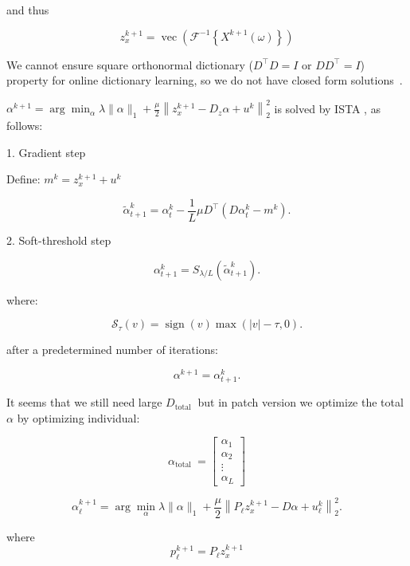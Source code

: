\documentclass{article}
\newcounter{subsubsubsection}[subsubsection]
\theoremstyle{definition}
\begin{document}
and thus

$$
z_x^{k+1}=\operatorname{vec}\left(\mathcal{F}^{-1}\left\{X^{k+1}(\omega)\right\}\right)
$$



















We cannot ensure square orthonormal dictionary ($D^{\top} D=I$ or $ DD^{\top}=I$) property for online dictionary learning, so we do not have closed form solutions~\cite{OnlineDLearn}.

$\alpha^{k+1}=\arg \min _\alpha \lambda\|\alpha\|_1+\frac{\mu}{2}\left\|z_x^{k+1}-D_z \alpha+u^k\right\|_2^2$  is solved by ISTA
\cite{FISTA}, \cite{ISTA} as follows:


1. Gradient step

Define: $m^k=z_x^{k+1}+u^k$

$$
\tilde{\alpha}^{k}_{t+1}=\alpha^{k}_{t}-\frac{1}{L} \mu D^{\top}\left(D \alpha^{k}_{t}-m^k\right) .
$$

2. Soft-threshold step

$$
\alpha^{k}_{t+1}=S_{\lambda / L}\left(\tilde{\alpha}^{k}_{t+1}\right) .
$$



where:

$$
\mathcal{S}_\tau(v)=\operatorname{sign}(v) \max (|v|-\tau, 0) .
$$

after a predetermined number of iterations:

$$
\alpha^{k+1}=\alpha^{k}_{t+1}.
$$

It seems that we still need large $D_{\text {total }}$ but in patch version we optimize the total $\alpha$ by optimizing individual:

$$\alpha_{\text {total }}=\left[\begin{array}{c}\alpha_1 \\ \alpha_2 \\ \vdots \\ \alpha_L\end{array}\right]$$

$$
\alpha_{\ell}^{k+1}=\arg \min _\alpha \lambda\|\alpha\|_1+\frac{\mu}{2}\left\|P_{\ell} z_x^{k+1}-D \alpha+u_{\ell}^k\right\|_2^2 .
$$

where 
$$
p_{\ell}^{k+1}=P_{\ell} z_x^{k+1}
$$
\end{document}
